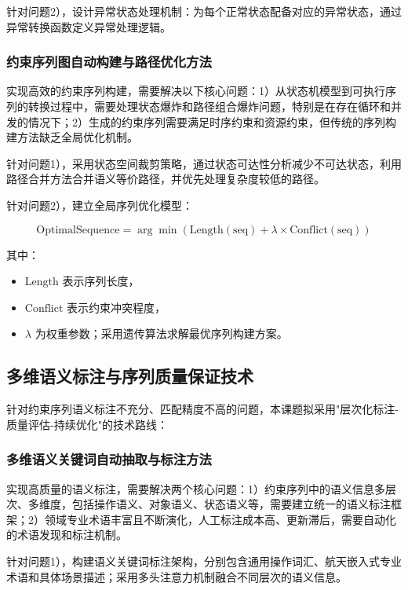 \documentclass[fontset=windows]{article}
\begin{document}
针对问题2），设计异常状态处理机制：为每个正常状态配备对应的异常状态，通过异常转换函数定义异常处理逻辑。

\subsubsection{约束序列图自动构建与路径优化方法}

实现高效的约束序列构建，需要解决以下核心问题：1）从状态机模型到可执行序列的转换过程中，需要处理状态爆炸和路径组合爆炸问题，特别是在存在循环和并发的情况下；2）生成的约束序列需要满足时序约束和资源约束，但传统的序列构建方法缺乏全局优化机制。

针对问题1），采用状态空间裁剪策略，通过状态可达性分析减少不可达状态，利用路径合并方法合并语义等价路径，并优先处理复杂度较低的路径。

针对问题2），建立全局序列优化模型：

\begin{equation}
\text{OptimalSequence} = \arg\min(\text{Length}(\text{seq}) + \lambda \times \text{Conflict}(\text{seq}))
\end{equation}

其中：
\begin{itemize}
    \item $\text{Length}$ 表示序列长度，
    \item $\text{Conflict}$ 表示约束冲突程度，
    \item $\lambda$ 为权重参数；采用遗传算法求解最优序列构建方案。
\end{itemize}

\subsection{多维语义标注与序列质量保证技术}

针对约束序列语义标注不充分、匹配精度不高的问题，本课题拟采用"层次化标注-质量评估-持续优化"的技术路线：

\subsubsection{多维语义关键词自动抽取与标注方法}

实现高质量的语义标注，需要解决两个核心问题：1）约束序列中的语义信息多层次、多维度，包括操作语义、对象语义、状态语义等，需要建立统一的语义标注框架；2）领域专业术语丰富且不断演化，人工标注成本高、更新滞后，需要自动化的术语发现和标注机制。

针对问题1），构建语义关键词标注架构，分别包含通用操作词汇、航天嵌入式专业术语和具体场景描述；采用多头注意力机制融合不同层次的语义信息。
\end{document}
